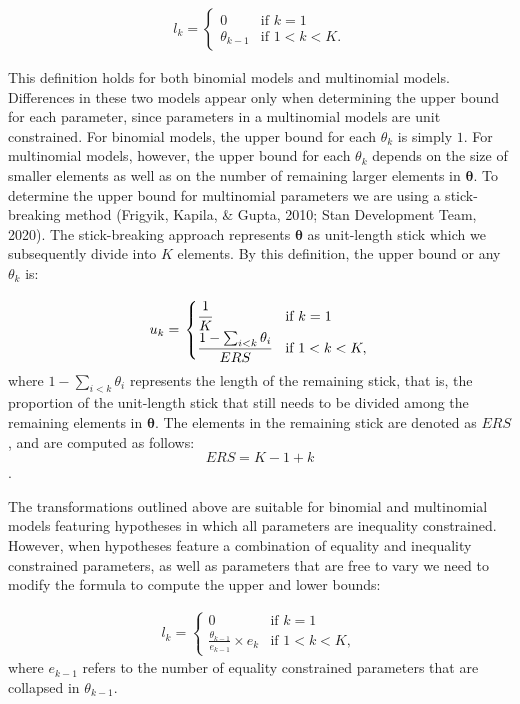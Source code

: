 \begin{appendix}
\begin{align*}
  l_k = \left.
  \begin{cases}
      0 & \text{if } k = 1 \\
      \theta_{k - 1} & \text{if } 1 < k < K.
  \end{cases}
    \right.
\end{align*}

This definition holds for both binomial models and multinomial models.
Differences in these two models appear only when determining the upper
bound for each parameter, since parameters in a multinomial models are
unit constrained. For binomial models, the upper bound for each
\(\theta_k\) is simply \(1\). For multinomial models, however, the upper
bound for each \(\theta_k\) depends on the size of smaller elements as
well as on the number of remaining larger elements in
\(\boldsymbol{\theta}\). To determine the upper bound for multinomial
parameters we are using a stick-breaking method (Frigyik, Kapila, \&
Gupta, 2010; Stan Development Team, 2020). The stick-breaking approach
represents \(\boldsymbol{\theta}\) as unit-length stick which we
subsequently divide into \(K\) elements. By this definition, the upper
bound or any \(\theta_k\) is:

\begin{align}
\label{Eq:upperBound}
  u_k = \left.
  \begin{cases}
      \cfrac{1}{K} & \text{if } k = 1 \\
      \cfrac{1 - \sum_{i < k} \theta_i}{ERS} & \text{if } 1 < k < K,
  \end{cases}
    \right.
\end{align} where \(1 - \sum_{i < k} \theta_i\) represents the length of
the remaining stick, that is, the proportion of the unit-length stick
that still needs to be divided among the remaining elements in
\(\boldsymbol{\theta}\). The elements in the remaining stick are denoted
as \(ERS\), and are computed as follows: \[ERS = K - 1 + k\].

The transformations outlined above are suitable for binomial and
multinomial models featuring hypotheses in which all parameters are
inequality constrained. However, when hypotheses feature a combination
of equality and inequality constrained parameters, as well as parameters
that are free to vary we need to modify the formula to compute the upper
and lower bounds:

\begin{align}
  l_k = \left.
  \begin{cases}
      0 & \text{if } k = 1 \\
      \frac{\theta_{k - 1}}{e_{k-1}} \times e_k & \text{if } 1 < k < K,
  \end{cases}
    \right.
\end{align} where \(e_{k-1}\) refers to the number of equality
constrained parameters that are collapsed in \(\theta_{k - 1}\).


\end{appendix}
